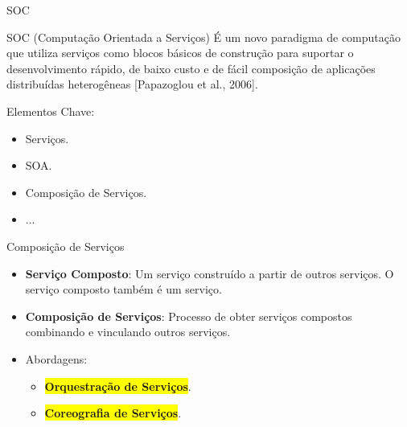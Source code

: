\documentclass[xcolor=svgnames]{beamer}
\begin{document}
    \begin{frame}{SOC}
       	\begin{block}{SOC (Computação Orientada a Serviços)}\vspace{-.3\baselineskip}
           É um novo paradigma de computação que utiliza serviços como blocos básicos de construção
           para suportar o desenvolvimento rápido, de baixo custo e de fácil composição de aplicações
           distribuídas heterogêneas [Papazoglou et al., 2006]. %
        \end{block}
        Elementos Chave:

        \begin{itemize}
           \item Serviços.
           \item SOA.
           \item Composição de Serviços.
           \item ...
        \end{itemize}


        \tiny{
        }
        	
    \end{frame}


    \begin{frame}{Composição de Serviços}
        \begin{itemize}
          \item \textbf{Serviço Composto}: Um serviço construído a partir de outros serviços. O serviço composto também é um serviço.
          \item \textbf{Composição de Serviços}: Processo de  obter serviços compostos combinando e vinculando outros serviços.
          \item <1->Abordagens:
                \begin{itemize}
                  \item <2->\colorbox{yellow}{\textbf{Orquestração de Serviços}}.
                  \item <3->\colorbox{yellow}{\textbf{Coreografia de Serviços}}.
                \end{itemize}
        \end{itemize}
    \end{frame}
\end{document}
